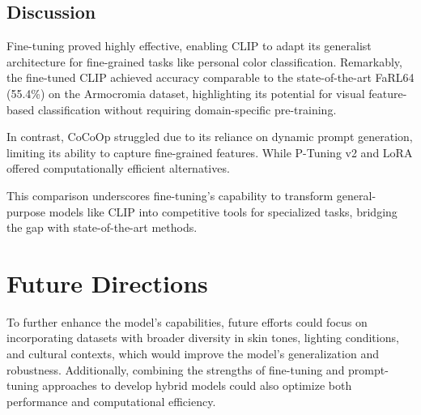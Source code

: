 \documentclass[twocolumn]{article}
\begin{document}
\subsection{Discussion}
Fine-tuning proved highly effective, enabling CLIP to adapt its generalist architecture for fine-grained tasks like personal color classification.\cite{wei2023improving} Remarkably, the fine-tuned CLIP achieved accuracy comparable to the state-of-the-art FaRL64 (55.4\%) on the Armocromia dataset,\cite{stacchiodeep} highlighting its potential for visual feature-based classification without requiring domain-specific pre-training.

In contrast, CoCoOp struggled due to its reliance on dynamic prompt generation,\cite{zhou2022conditional} limiting its ability to capture fine-grained features. While P-Tuning v2 and LoRA offered computationally efficient alternatives.\cite{hu2021lora}\cite{liu2021p}

This comparison underscores fine-tuning's capability to transform general-purpose models like CLIP into competitive tools for specialized tasks, bridging the gap with state-of-the-art methods.


\section{Future Directions}

To further enhance the model's capabilities, future efforts could focus on incorporating datasets with broader diversity in skin tones, lighting conditions, and cultural contexts, which would improve the model's generalization and robustness. Additionally, combining the strengths of fine-tuning and prompt-tuning approaches to develop hybrid models could also optimize both performance and computational efficiency. 

\nocite{*}
\printbibliography
\end{document}
